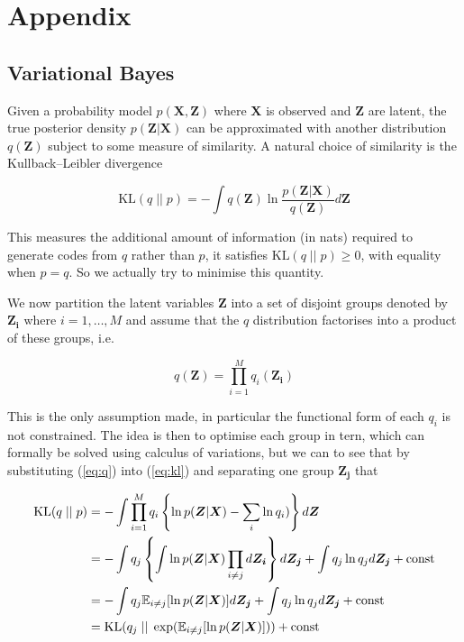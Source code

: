 \documentclass{article}
\begin{document}
\section{Appendix}

\subsection{Variational Bayes}

Given a probability model $p(\boldsymbol{X}, \boldsymbol{Z})$ where $\boldsymbol{X}$ is observed and $\boldsymbol{Z}$ are latent, the true posterior density $p(\boldsymbol{Z} | \boldsymbol{X})$ can be approximated with another distribution $q(\boldsymbol{Z})$ subject to some measure of similarity. A natural choice of similarity is the Kullback–Leibler divergence

\begin{equation}
\label{eq:kl}
   \text{KL} (q\; ||\; p) = -\int q(\boldsymbol{Z}) \ln \frac{p(\boldsymbol{Z} | \boldsymbol{X})}{q(\boldsymbol{Z})} d\boldsymbol{Z}
\end{equation}

This measures the additional amount of information (in nats) required to generate codes from $q$ rather than $p$, it satisfies $\text{KL}(q\; ||\; p) \ge 0$, with equality when $p = q$. So we actually try to minimise this quantity.

We now partition the latent variables $\boldsymbol{Z}$ into a set of disjoint groups denoted by $\boldsymbol{Z_i}$ where $i = 1, \dots, M$ and assume that the $q$ distribution factorises into a product of these groups, i.e.

\begin{equation}
\label{eq:q}
  q(\boldsymbol{Z}) = \prod_{i = 1}^M q_i(\boldsymbol{Z_i})
\end{equation}

This is the only assumption made, in particular the functional form of each $q_i$ is not constrained. The idea is then to optimise each group in tern, which can formally be solved using calculus of variations, but we can to see that by substituting (\ref{eq:q}) into (\ref{eq:kl}) and separating one group $\boldsymbol{Z_j}$ that

\begin{align}
    \text{KL}(q\; ||\; p) &= -\int \prod_{i = 1}^M q_i \left\{ \ln p(\boldsymbol{Z} | \boldsymbol{X}) - \sum_i \ln q_i) \right\} d \boldsymbol{Z}\notag \\
    &= -\int q_j \left\{ \int \ln p(\boldsymbol{Z} | \boldsymbol{X}) \prod_{i \ne j} d \boldsymbol{Z_i} \right\} d \boldsymbol{Z_j} + \int q_j \ln q_j d \boldsymbol{Z_j} + \text{const}\notag\\
    &= -\int q_j \mathbb{E}_{i \ne j}[\ln p(\boldsymbol{Z} | \boldsymbol{X})] d \boldsymbol{Z_j} + \int q_j \ln q_j d \boldsymbol{Z_j} + \text{const}\notag\\
    &= \text{KL}(q_j\; ||\; \exp (\mathbb{E}_{i \ne j}[\ln p(\boldsymbol{Z} | \boldsymbol{X})])) + \text{const}
\end{align}
\end{document}
